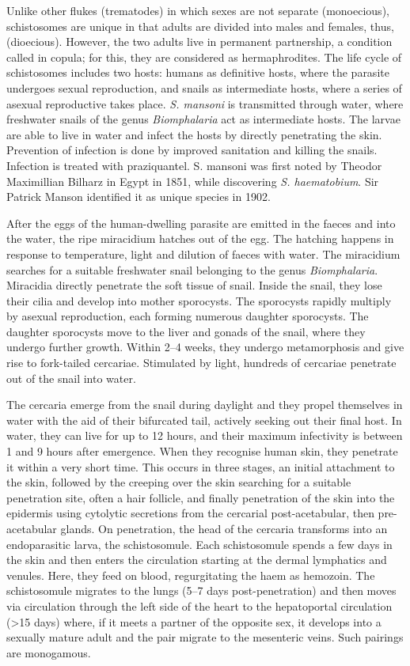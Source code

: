 \documentclass[]{book}
\theoremstyle{definition}
\theoremstyle{definition}
\theoremstyle{definition}
\theoremstyle{remark}
\begin{document}
Unlike other flukes (trematodes) in which sexes are not separate
(monoecious), schistosomes are unique in that adults are divided into
males and females, thus, (dioecious). However, the two adults live in
permanent partnership, a condition called in copula; for this, they are
considered as hermaphrodites. The life cycle of schistosomes includes
two hosts: humans as definitive hosts, where the parasite undergoes
sexual reproduction, and snails as intermediate hosts, where a series of
asexual reproductive takes place. \emph{S. mansoni} is transmitted through
water, where freshwater snails of the genus \emph{Biomphalaria} act as
intermediate hosts. The larvae are able to live in water and infect the
hosts by directly penetrating the skin. Prevention of infection is done
by improved sanitation and killing the snails. Infection is treated with
praziquantel. S. mansoni was first noted by Theodor Maximillian Bilharz
in Egypt in 1851, while discovering \emph{S. haematobium}. Sir Patrick Manson
identified it as unique species in 1902.

After the eggs of the human-dwelling parasite are emitted in the faeces
and into the water, the ripe miracidium hatches out of the egg. The
hatching happens in response to temperature, light and dilution of
faeces with water. The miracidium searches for a suitable freshwater
snail belonging to the genus \emph{Biomphalaria}. Miracidia directly penetrate
the soft tissue of snail. Inside the snail, they lose their cilia and
develop into mother sporocysts. The sporocysts rapidly multiply by
asexual reproduction, each forming numerous daughter sporocysts. The
daughter sporocysts move to the liver and gonads of the snail, where
they undergo further growth. Within 2--4 weeks, they undergo
metamorphosis and give rise to fork-tailed cercariae. Stimulated by
light, hundreds of cercariae penetrate out of the snail into water.

The cercaria emerge from the snail during daylight and they propel
themselves in water with the aid of their bifurcated tail, actively
seeking out their final host. In water, they can live for up to 12
hours, and their maximum infectivity is between 1 and 9 hours after
emergence. When they recognise human skin, they penetrate it within a
very short time. This occurs in three stages, an initial attachment to
the skin, followed by the creeping over the skin searching for a
suitable penetration site, often a hair follicle, and finally
penetration of the skin into the epidermis using cytolytic secretions
from the cercarial post-acetabular, then pre-acetabular glands. On
penetration, the head of the cercaria transforms into an endoparasitic
larva, the schistosomule. Each schistosomule spends a few days in the
skin and then enters the circulation starting at the dermal lymphatics
and venules. Here, they feed on blood, regurgitating the haem as
hemozoin. The schistosomule migrates to the lungs (5--7 days
post-penetration) and then moves via circulation through the left side
of the heart to the hepatoportal circulation (\textgreater{}15 days)
where, if it meets a partner of the opposite sex, it develops into a
sexually mature adult and the pair migrate to the mesenteric veins. Such
pairings are monogamous.
\end{document}
